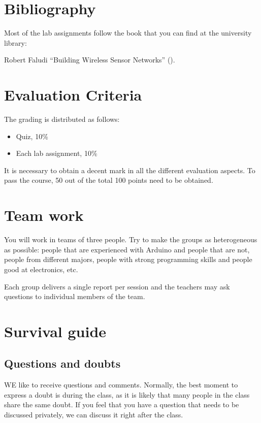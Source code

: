 \section{Bibliography}

Most of the lab assignments follow the book that you can find at the university library:

Robert Faludi ``Building Wireless Sensor Networks'' (\cite{faludi2010bws}).


\section{Evaluation Criteria}

The grading is distributed as follows:
\begin{itemize}
\item Quiz, 10\%
\item Each lab assignment, 10\%
\end{itemize}

It is necessary to obtain a decent mark in all the different evaluation aspects.
To pass the course, 50 out of the total 100 points need to be obtained.

\section{Team work}

You will work in teams of three people.
Try to make the groups as heterogeneous as possible: people that are experienced with Arduino and people that are not, people from different majors, people with strong programming skills and people good at electronics, etc.

Each group delivers a single report per session and the teachers may ask questions to individual members of the team.

\section{Survival guide}

\subsection{Questions and doubts}
WE like to receive questions and comments.
Normally, the best moment to express a doubt is during the class, as it is likely that many people in the class share the same doubt.
If you feel that you have a question that needs to be discussed privately, we can discuss it right after the class.

